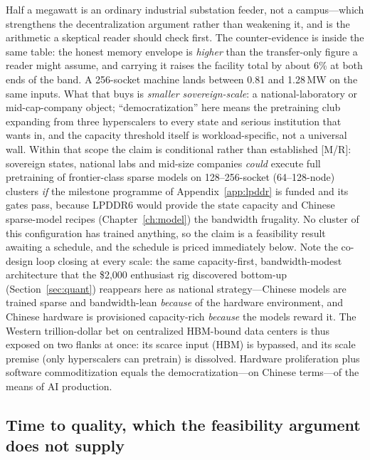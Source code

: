 Half a megawatt is an ordinary industrial substation feeder, not a campus---which strengthens the decentralization argument rather than weakening it, and is the arithmetic a skeptical reader should check first. The counter-evidence is inside the same table: the honest memory envelope is \emph{higher} than the transfer-only figure a reader might assume, and carrying it raises the facility total by about 6\% at both ends of the band. A 256-socket machine lands between 0.81 and 1.28\,MW on the same inputs. What that buys is \emph{smaller sovereign-scale}: a national-laboratory or mid-cap-company object; ``democratization'' here means the pretraining club expanding from three hyperscalers to every state and serious institution that wants in, and the capacity threshold itself is workload-specific, not a universal wall. Within that scope the claim is conditional rather than established [M/R]: sovereign states, national labs and mid-size companies \emph{could} execute full pretraining of frontier-class sparse models on 128--256-socket (64--128-node) clusters \emph{if} the milestone programme of Appendix~\ref{app:lpddr} is funded and its gates pass, because LPDDR6 would provide the state capacity and Chinese sparse-model recipes (Chapter~\ref{ch:model}) the bandwidth frugality. No cluster of this configuration has trained anything, so the claim is a feasibility result awaiting a schedule, and the schedule is priced immediately below. Note the co-design loop closing at every scale: the same capacity-first, bandwidth-modest architecture that the \$2,000 enthusiast rig discovered bottom-up (Section~\ref{sec:quant}) reappears here as national strategy---Chinese models are trained sparse and bandwidth-lean \emph{because} of the hardware environment, and Chinese hardware is provisioned capacity-rich \emph{because} the models reward it. The Western trillion-dollar bet on centralized HBM-bound data centers is thus exposed on two flanks at once: its scarce input (HBM) is bypassed, and its scale premise (only hyperscalers can pretrain) is dissolved. Hardware proliferation plus software commoditization equals the democratization---on Chinese terms---of the means of AI production.

\subsection{Time to quality, which the feasibility argument does not supply}
\label{sec:traintime}

